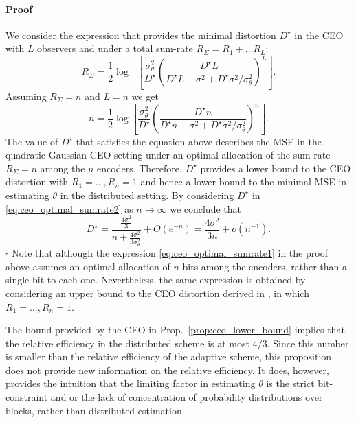 \documentclass[letterpaper, conference]{IEEEtran}      %
\newenvironment{proof}{\paragraph*{Proof}}{\hfill$\square$ \newline}
\begin{document}
\begin{proof}
We consider the expression \cite[Eq. 10]{chen2004upper} that provides the minimal distortion $D^\star$ in the CEO with $L$ observers and under a total sum-rate $R_\Sigma = R_1 + \ldots R_L$:
\begin{equation} \label{eq:ceo_optimal_sumrate1}
R_{\Sigma} = \frac{1}{2} \log^+ \left[ \frac{\sigma_\theta^2}{D^\star} \left( \frac{D^\star L}{ D^\star L - \sigma^2 + D^\star \sigma^2 / \sigma_\theta^2 }\right)^L  \right].
\end{equation}
Assuming $R_\Sigma = n$ and $L=n$ we get
\begin{equation} \label{eq:ceo_optimal_sumrate2}
n = \frac{1}{2} \log \left[ \frac{\sigma_\theta^2}{D^\star} \left(\frac{ D^\star n }{D^\star n - \sigma^2 + D^\star \sigma^2/\sigma_\theta^2 }  \right)^n  \right].
\end{equation}
The value of $D^\star$ that satisfies the equation above describes the MSE in the quadratic Gaussian CEO setting under an optimal allocation of the sum-rate $R_\Sigma = n$ among the $n$ encoders. Therefore, $D^\star$ provides a lower bound to the CEO distortion with $R_1=\ldots,R_n = 1$ and hence a lower bound to the minimal MSE in estimating $\theta$ in the distributed setting. By considering $D^\star$ in \eqref{eq:ceo_optimal_sumrate2} as $n\rightarrow \infty$ we conclude that 
\[
D^\star = \frac{ \frac{4\sigma^2}{3} }{n + \frac{4 \sigma^2}{3 \sigma_\theta^2} } + O(e^{-n}) =  \frac{4\sigma^2}{3n} + o(n^{-1}). 
\]
\end{proof}
Note that although the expression \eqref{eq:ceo_optimal_sumrate1} in the proof above assumes an optimal allocation of $n$ bits among the encoders, rather than a single bit to each one. Nevertheless, the same expression is obtained by considering an upper bound to the CEO distortion derived in \cite[Prop. 5.2]{KipnisRini2017}, in which $R_1=\ldots,R_n = 1$. %

The bound provided by the CEO in Prop.~\ref{prop:ceo_lower_bound} implies that the relative efficiency in the distributed scheme is at most $4/3$. Since this number is smaller than the relative efficiency of the adaptive scheme, this proposition does not provide new information on the relative efficiency. It does, however, provides the intuition that the limiting factor in estimating $\theta$ is the strict bit-constraint and or the lack of concentration of probability distributions over blocks, rather than distributed estimation. \\
\end{document}
